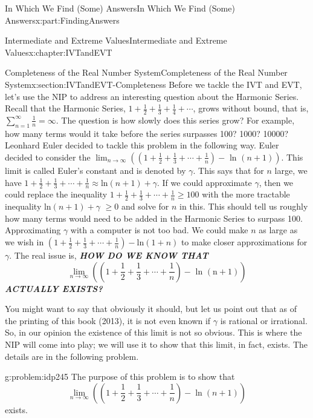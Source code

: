 \documentclass[oneside,10pt,]{book}
\newcommand{\alert}[1]{\textbf{\textit{#1}}}
\numberwithin{equation}{section}
\begin{document}
\begin{partptx}{In Which We Find (Some) Answers}{}{In Which We Find (Some) Answers}{}{}{x:part:FindingAnswers}
\begin{chapterptx}{Intermediate and Extreme Values}{}{Intermediate and Extreme Values}{}{}{x:chapter:IVTandEVT}
\begin{sectionptx}{Completeness of the Real Number System}{}{Completeness of the Real Number System}{}{}{x:section:IVTandEVT-Completeness}
Before we tackle the IVT and EVT, let's use the NIP to address an interesting question about the Harmonic Series.  Recall that the Harmonic Series, \(1+\frac{1}{2}+\frac{1}{3}+\frac{1}{4}+\cdots\), grows without bound, that is, \(\sum_{n=1}^\infty\frac{1}{n}=\infty\).  The question is how slowly does this series grow?  For example, how many terms would it take before the series surpasses 100? 1000? 10000?  Leonhard Euler  decided to tackle this problem in the following way.  Euler decided to consider the \(\lim_{n\rightarrow\infty}\left(\left(1+\frac{1}{2}+\frac{1}{3}+\cdots+
\frac{1}{n}\right)-\text{ ln } \left(n+1\right)\right)\).  This limit is called Euler's constant and is denoted by \(\gamma\). This says that for \(n\) large, we have \(1+\frac{1}{2}+\frac{1}{3}+\cdots+\frac{1}{n}\approx\)ln\(\left(n+1\right)+\gamma\). If we could approximate \(\gamma\), then we could replace the inequality \(1+\frac{1}{2}+\frac{1}{3}+\cdots+\frac{1}{n}\geq
100\) with the more tractable inequality ln\(\left(n+1\right)+\gamma\) \(\geq 0\) and solve for \(n\) in this.  This should tell us roughly how many terms would need to be added in the Harmonic Series to surpass 100. Approximating \(\gamma\) with a computer is not too bad.  We could make \(n\) as large as we wish in \(\left(1+\frac{1}{2}+\frac{1}{3}+\cdots+\frac{1}{n}\right)-\)ln\(\left(1+n\right)\) to make closer approximations for \(\gamma\).  The real issue is, \alert{HOW DO WE KNOW THAT}%
\begin{equation*}
\lim_{n\rightarrow\infty}\left(\left(1+\frac{1}{2}+\frac{1}{3}+\cdots+\frac{1}{n}\right)-\text{ ln } \left(\text{n} +1\right)\right)
\end{equation*}
\alert{ACTUALLY EXISTS?}%
\par
You might want to say that obviously it should, but let us point out that as of the printing of this book (2013), it is not even known if \(\gamma\) is rational or irrational. So, in our opinion the existence of this limit is not so obvious. This is where the NIP will come into play; we will use it to show that this limit, in fact, exists. The details are in the following problem.%
\begin{problem}{}{g:problem:idp245}%
The purpose of this problem is to show that%
\begin{equation*}
\lim_{n\rightarrow\infty}\left(\left(1+\frac{1}{2}+\frac{1}{3}+\cdots+ \frac{1}{n}\right)-\ln\left(n+1\right)\right)
\end{equation*}
exists.%
\begin{enumerate}[font=\bfseries,label=(\alph*),ref=\alph*]

\end{enumerate}
\end{problem}
\end{sectionptx}
\end{chapterptx}
\end{partptx}
\end{document}
